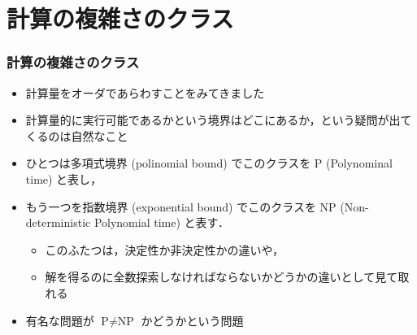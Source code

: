 \section{計算の複雑さのクラス}
\begin{frame}[shrink]
\frametitle{計算の複雑さのクラス}
  \begin{itemize}
\item 計算量をオーダであらわすことをみてきました
\item 計算量的に実行可能であるかという境界はどこにあるか，という疑問が出てくるのは自然なこと
\item ひとつは多項式境界 (polinomial bound) でこのクラスを P (Polynominal time) と表し，
\item もう一つを指数境界 (exponential bound) でこのクラスを NP (Non-deterministic Polynomial time) と表す．
    \begin{itemize}
\item このふたつは，決定性か非決定性かの違いや，
\item 解を得るのに全数探索しなければならないかどうかの違いとして見て取れる
    \end{itemize}
\item 有名な問題が \(\mbox{P}\neq\mbox{NP}\) かどうかという問題
  \end{itemize}
\end{frame}
